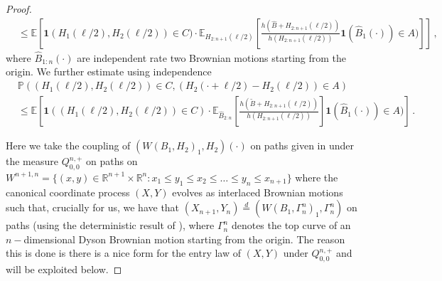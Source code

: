 \documentclass[11pt, reqno]{amsart}
\numberwithin{equation}{section}
\newcommand{\R}{\ensuremath{\mathbb{R}}}
\newcommand{\PP}{\ensuremath{\mathbb{P}}}
\begin{document}
\begin{proof}
\begin{equation*}
\begin{array}{cc}
         & \le \mathbb{E}\left[\mathbf{1}(H_1(\ell/2), H_2 (\ell/2))\in C)\cdot\mathbb{E}_{H_{2:n+1}(\ell/2)}\left[\frac{h(\hat{B}+H_{2:n+1}(\ell/2))}{h(H_{2:n+1}(\ell/2))}\mathbf{1}(\hat{B}_1(\cdot))\in A)\right]\right]\,,
    \end{array}
\end{equation*}
where $\hat{B}_{1:n}(\cdot)$ are independent rate two Brownian motions starting from the origin. We further estimate using independence
\begin{equation*}
    \begin{array}{cc}
         & \PP((H_1(\ell/2), H_2 (\ell/2))\in C, (H_2(\cdot + \ell/2)-H_2(\ell/2))\in A) \\
         & \le \mathbb{E}\left[\mathbf{1}((H_1(\ell/2), H_2 (\ell/2))\in C)\cdot\mathbb{E}_{\hat{B}_{2:n}}\left[\frac{h(\tilde{B}+H_{2:n+1}(\ell/2))}{h(H_{2:n+1}(\ell/2))}\right]\mathbf{1}(\hat{B}_1(\cdot))\in A)\right]\,.
    \end{array}
\end{equation*}

Here we take the coupling of $(W(B_{1}, H_2)_1, H_2)(\cdot)$ on paths given in \cite{warren2007dyson} under the measure $Q^{n,+}_{0,0}$ on paths on $W^{n+1, n}=\{ (x,y) \in {\R}^{n+1} \times {\R}^n: x_{1} \leq y_1 \leq x_2\leq \ldots \leq y_n \leq x_{n+1} \}$ where the canonical coordinate process $(X,Y)$ evolves as interlaced Brownian motions such that, crucially for us, we have that $(X_{n+1}, Y_{n})\stackrel{d}{=} (W(B_{1}, \Gamma^n_n)_1, \Gamma^n_n)$ on paths (using the deterministic result of \cite[lemma 2.1]{revuz2013continuous}), where $\Gamma^n_n$ denotes the top curve of an $n-$dimensional Dyson Brownian motion starting from the origin. The reason this is done is there is a nice form for the entry law of $(X,Y)$ under $Q^{n,+}_{0,0}$ and will be exploited below.


\end{proof}
\end{document}
